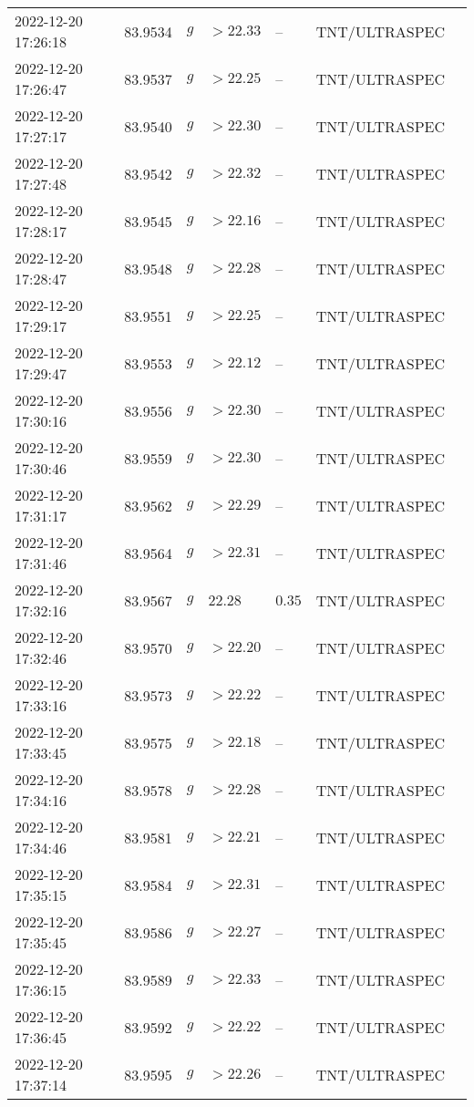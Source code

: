 \documentclass{nature_plusfigure}
\begin{document}
\begin{supplement}
\begin{center}
\begin{longtable}{lllllll}
2022-12-20 17:26:18 & 83.9534 & $g$ & $>22.33$ & -- & TNT/ULTRASPEC &  \\ 
2022-12-20 17:26:47 & 83.9537 & $g$ & $>22.25$ & -- & TNT/ULTRASPEC &  \\ 
2022-12-20 17:27:17 & 83.9540 & $g$ & $>22.30$ & -- & TNT/ULTRASPEC &  \\ 
2022-12-20 17:27:48 & 83.9542 & $g$ & $>22.32$ & -- & TNT/ULTRASPEC &  \\ 
2022-12-20 17:28:17 & 83.9545 & $g$ & $>22.16$ & -- & TNT/ULTRASPEC &  \\ 
2022-12-20 17:28:47 & 83.9548 & $g$ & $>22.28$ & -- & TNT/ULTRASPEC &  \\ 
2022-12-20 17:29:17 & 83.9551 & $g$ & $>22.25$ & -- & TNT/ULTRASPEC &  \\ 
2022-12-20 17:29:47 & 83.9553 & $g$ & $>22.12$ & -- & TNT/ULTRASPEC &  \\ 
2022-12-20 17:30:16 & 83.9556 & $g$ & $>22.30$ & -- & TNT/ULTRASPEC &  \\ 
2022-12-20 17:30:46 & 83.9559 & $g$ & $>22.30$ & -- & TNT/ULTRASPEC &  \\ 
2022-12-20 17:31:17 & 83.9562 & $g$ & $>22.29$ & -- & TNT/ULTRASPEC &  \\ 
2022-12-20 17:31:46 & 83.9564 & $g$ & $>22.31$ & -- & TNT/ULTRASPEC &  \\ 
2022-12-20 17:32:16 & 83.9567 & $g$ & $22.28$ & $0.35$ & TNT/ULTRASPEC &  \\ 
2022-12-20 17:32:46 & 83.9570 & $g$ & $>22.20$ & -- & TNT/ULTRASPEC &  \\ 
2022-12-20 17:33:16 & 83.9573 & $g$ & $>22.22$ & -- & TNT/ULTRASPEC &  \\ 
2022-12-20 17:33:45 & 83.9575 & $g$ & $>22.18$ & -- & TNT/ULTRASPEC &  \\ 
2022-12-20 17:34:16 & 83.9578 & $g$ & $>22.28$ & -- & TNT/ULTRASPEC &  \\ 
2022-12-20 17:34:46 & 83.9581 & $g$ & $>22.21$ & -- & TNT/ULTRASPEC &  \\ 
2022-12-20 17:35:15 & 83.9584 & $g$ & $>22.31$ & -- & TNT/ULTRASPEC &  \\ 
2022-12-20 17:35:45 & 83.9586 & $g$ & $>22.27$ & -- & TNT/ULTRASPEC &  \\ 
2022-12-20 17:36:15 & 83.9589 & $g$ & $>22.33$ & -- & TNT/ULTRASPEC &  \\ 
2022-12-20 17:36:45 & 83.9592 & $g$ & $>22.22$ & -- & TNT/ULTRASPEC &  \\ 
2022-12-20 17:37:14 & 83.9595 & $g$ & $>22.26$ & -- & TNT/ULTRASPEC &  \\ 

\end{longtable}
\end{center}
\end{supplement}
\end{document}

